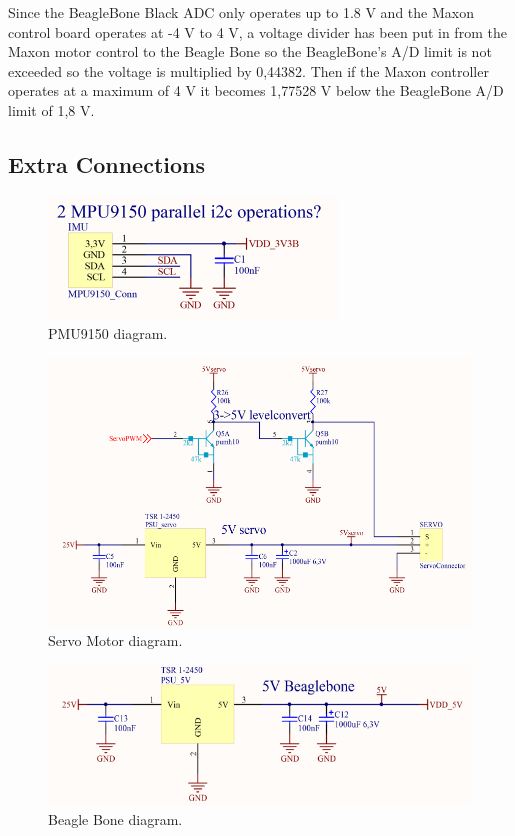 Since the BeagleBone Black ADC only operates up to 1.8 V and the Maxon control board operates at -4 V to 4 V, a voltage divider has been put in from the Maxon motor control to the Beagle Bone so the BeagleBone’s A/D limit is not exceeded so the voltage is multiplied by 0,44382. Then if the Maxon controller operates at a maximum of 4 V it becomes 1,77528 V below the BeagleBone A/D limit of 1,8 V.

\subsection{Extra Connections}
\begin{figure}[H]
	\centering
	\includegraphics[scale=0.92]{figures/PMU9150.pdf}
	\caption{PMU9150 diagram.}
	\label{labPMU9150}
\end{figure}\vspace{-5mm}

\begin{figure}[H]
	\centering
	\includegraphics[scale=0.92]{figures/ServoMotor.pdf}
	\caption{Servo Motor diagram.}
	\label{labServoMotor}
\end{figure}\vspace{-5mm}

\begin{figure}[H]
	\centering
	\includegraphics[scale=0.92]{figures/BeagleBone.pdf}
	\caption{Beagle Bone diagram.}
	\label{labBeagleBone}
\end{figure}\vspace{-5mm}

